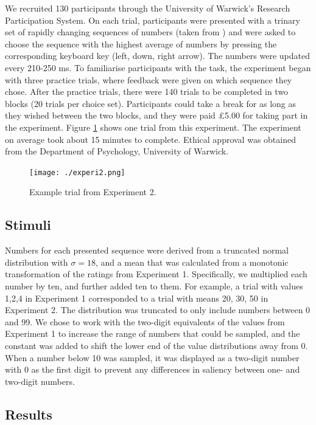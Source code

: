 \documentclass[11pt,a4paper]{article}
\begin{document}
We recruited 130 participants through the University of Warwick's Research Participation System. On each trial, participants were presented with a trinary set of rapidly changing sequences of numbers (taken from ) and were asked to choose the sequence with the highest average of numbers by pressing the corresponding keyboard key (left, down, right arrow). The numbers were updated every 210-250 ms. To familiarise participants with the task, the experiment began with three practice trials, where feedback were given on which sequence they chose. After the practice trials, there were 140 trials to be completed in two blocks (20 trials per choice set). Participants could take a break for as long as they wished between the two blocks, and they were paid £5.00 for taking part in the experiment. Figure \ref{fig:experi2_numbers} shows one trial from this experiment. The experiment on average took about 15 minutes to complete. Ethical approval was obtained from the Department of Psychology, University of Warwick.

\begin{figure}
\captionsetup{justification=centering}
\centering
\caption{Example trial from Experiment 2.}
\texttt{[image: ./experi2.png]}
\label{fig:experi2_numbers}
\end{figure}

\subsection{Stimuli}

Numbers for each presented sequence were derived from a truncated normal distribution with $\sigma=18$, and a mean that was calculated from a monotonic transformation of the ratings from Experiment 1. Specifically, we multiplied each number by ten, and further added ten to them. For example, a trial with values 1,2,4 in Experiment 1 corresponded to a trial with means 20, 30, 50 in Experiment 2. The distribution was truncated to only include numbers between 0 and 99. We chose to work with the two-digit equivalents of the values from Experiment 1 to increase the range of numbers that could be sampled, and the constant was added to shift the lower end of the value distributions away from 0. When a number below 10 was sampled, it was displayed as a two-digit number with 0 as the first digit to prevent any differences in saliency between one- and two-digit numbers.


\subsection{Results}
\end{document}
